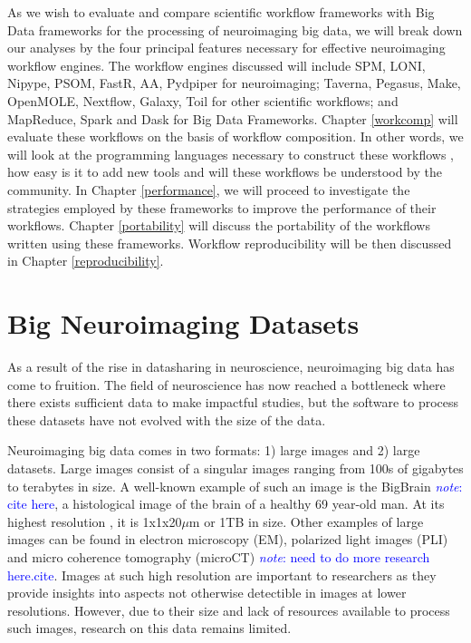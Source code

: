\documentclass{report}
\newcommand{\note}[1]{\textcolor{blue}{\textit{note}: #1}}
\begin{document}
        As we wish to evaluate and compare scientific workflow frameworks with
        Big Data frameworks for the processing of neuroimaging big data, we will
        break down our analyses by the four principal features necessary for
        effective neuroimaging workflow engines. The workflow engines discussed
        will include SPM, LONI, Nipype, PSOM, FastR, AA, Pydpiper 
        for neuroimaging; Taverna, Pegasus, Make, OpenMOLE, Nextflow, Galaxy, 
        Toil for other scientific workflows; and MapReduce, Spark and Dask for
        Big Data Frameworks. Chapter \ref{workcomp} will evaluate these 
        workflows on the basis of workflow composition. In other words, we will
        look at the programming languages necessary to construct these workflows
        , how easy is it to add new tools and will these workflows be understood
        by the community. In Chapter \ref{performance}, we will proceed to 
        investigate the strategies employed by these frameworks to improve the 
        performance of their workflows. Chapter \ref{portability} will discuss
        the portability of the workflows written using these frameworks. 
        Workflow reproducibility will be then discussed in Chapter 
        \ref{reproducibility}.
        

        \section{Big Neuroimaging Datasets}\label{datasets}

            As a result of the rise in datasharing in neuroscience, neuroimaging
            big data has come to fruition. The field of neuroscience has now
            reached a bottleneck where there exists sufficient data to make
            impactful studies, but the software to process these datasets have 
            not evolved with the size of the data.

            Neuroimaging big data comes in two formats: 1) large images and 2) 
            large datasets. Large images consist of a singular images ranging 
            from 100s of gigabytes to terabytes in size. A well-known example of 
            such an image is the BigBrain \note{cite here}, a histological image 
            of the brain of a healthy 69 year-old man. At its highest resolution
            , it is 1x1x20$\mu$m or 1TB in
            size. Other examples of large images can be found in electron 
            microscopy (EM), polarized light images (PLI) and micro coherence 
            tomography (microCT) \note{need to do more research here.cite}. 
            Images at 
            such high resolution are important to researchers as they provide 
            insights into aspects not otherwise detectible in images at lower 
            resolutions. However, due to their size and lack of resources 
            available to process such images, research on this data remains 
            limited.
\end{document}
